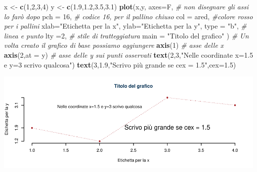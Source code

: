 \documentclass[
  11pt,
]{book}
\newenvironment{Shaded}{\begin{snugshade}}{\end{snugshade}}
\newcommand{\AttributeTok}[1]{\textcolor[rgb]{0.13,0.29,0.53}{#1}}
\newcommand{\CommentTok}[1]{\textcolor[rgb]{0.56,0.35,0.01}{\textit{#1}}}
\newcommand{\DecValTok}[1]{\textcolor[rgb]{0.00,0.00,0.81}{#1}}
\newcommand{\FloatTok}[1]{\textcolor[rgb]{0.00,0.00,0.81}{#1}}
\newcommand{\FunctionTok}[1]{\textcolor[rgb]{0.13,0.29,0.53}{\textbf{#1}}}
\newcommand{\NormalTok}[1]{#1}
\newcommand{\OtherTok}[1]{\textcolor[rgb]{0.56,0.35,0.01}{#1}}
\newcommand{\StringTok}[1]{\textcolor[rgb]{0.31,0.60,0.02}{#1}}
\theoremstyle{mytheoremstyle}
\theoremstyle{mydefstyle}
\begin{document}
\begin{Shaded}
\begin{Highlighting}[]
\NormalTok{x }\OtherTok{\textless{}{-}} \FunctionTok{c}\NormalTok{(}\DecValTok{1}\NormalTok{,}\DecValTok{2}\NormalTok{,}\DecValTok{3}\NormalTok{,}\DecValTok{4}\NormalTok{)}
\NormalTok{y }\OtherTok{\textless{}{-}} \FunctionTok{c}\NormalTok{(}\FloatTok{1.9}\NormalTok{,}\FloatTok{1.2}\NormalTok{,}\FloatTok{3.5}\NormalTok{,}\FloatTok{3.1}\NormalTok{)}
\FunctionTok{plot}\NormalTok{(x,y,}
     \AttributeTok{axes=}\NormalTok{F,      }\CommentTok{\# non disegnare gli assi lo farò dopo}
     \AttributeTok{pch =} \DecValTok{16}\NormalTok{,    }\CommentTok{\# codice 16, per il pallino chiuso}
     \AttributeTok{col =}\NormalTok{ ared, }\CommentTok{\#colore rosso per i pallini}
     \AttributeTok{xlab=}\StringTok{"Etichetta per la x"}\NormalTok{,}
     \AttributeTok{ylab=}\StringTok{"Etichetta per la y"}\NormalTok{,}
     \AttributeTok{type =} \StringTok{"b"}\NormalTok{,  }\CommentTok{\# linea e punto}
     \AttributeTok{lty  =}\DecValTok{2}\NormalTok{,     }\CommentTok{\# stile di tratteggiatura}
     \AttributeTok{main =} \StringTok{"Titolo del grafico"}
\NormalTok{          )}
\CommentTok{\# Un volta creato il grafico di base possiamo aggiungere }
\FunctionTok{axis}\NormalTok{(}\DecValTok{1}\NormalTok{) }\CommentTok{\# asse delle x}
\FunctionTok{axis}\NormalTok{(}\DecValTok{2}\NormalTok{,}\AttributeTok{at =}\NormalTok{ y) }\CommentTok{\# asse delle y sui punti osservati}
\FunctionTok{text}\NormalTok{(}\DecValTok{2}\NormalTok{,}\DecValTok{3}\NormalTok{,}\StringTok{"Nelle coordinate x=1.5 e y=3 scrivo qualcosa"}\NormalTok{)}
\FunctionTok{text}\NormalTok{(}\DecValTok{3}\NormalTok{,}\FloatTok{1.9}\NormalTok{,}\StringTok{"Scrivo più grande se cex = 1.5"}\NormalTok{,}\AttributeTok{cex=}\FloatTok{1.5}\NormalTok{)}
\end{Highlighting}
\end{Shaded}

\begin{center}\includegraphics{Appunti_di_Statistica_2025_files/figure-latex/24-Libro-25,-1} \end{center}
\end{document}
